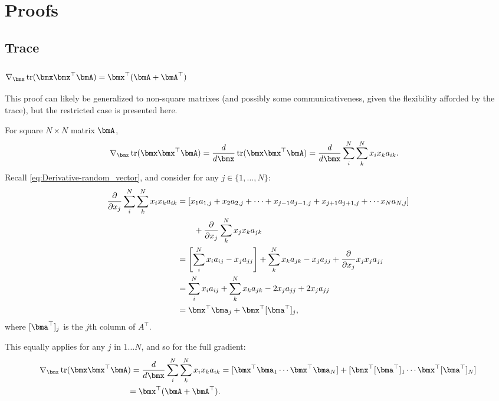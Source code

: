 \documentclass[11pt]{article}
\DeclareMathOperator{\Trace}{tr}
\begin{document}
\appendix
\section{Proofs}
\subsection{Trace}
\subsubsection{\hyperref[sec:Trace-Derivative-tr(xx'A)]{$\nabla_{\bmx}\Trace(\bmx \bmx^\top \bmA) = \bmx^\top (\bmA + \bmA^\top)$}}
\label{proof:Trace-Derivative-tr(xx'A)}
This proof can likely be generalized to non-square matrixes (and possibly some communicativeness, given the flexibility afforded by the trace), but the restricted case is presented here.

For square $N\times N$ matrix $\bmA$,
\begin{align*}
\nabla_{\bmx}\Trace(\bmx \bmx^\top \bmA) =
\frac{d}{d \bmx}\Trace(\bmx \bmx^\top \bmA) &=
\frac{d}{d \bmx} \sum_{i}^{N} \sum_{k}^{N} x_i x_k a_{ik}.
\end{align*}
Recall \cref{eq:Derivative-random_vector}, and consider for any $j \in \{1,\ldots, N\}$:
\begin{align*}
\frac{\partial}{\partial x_j} \sum_{i}^{N} \sum_{k}^{N} x_i x_k a_{ik} &=
[x_1a_{1,j} + x_2a_{2,j} + \cdots + x_{j-1}a_{j-1,j} + x_{j+1}a_{j+1,j} + \cdots x_N a_{N,j}] \\ &\qquad + \frac{\partial}{\partial x_j} \sum_{k}^{N} x_j x_k a_{jk} \\
&= \left[\sum_i^N x_ia_{ij} - x_ja_{jj}\right] + \sum_{k}^{N} x_k a_{jk} - x_ja_{jj} + \frac{\partial}{\partial x_j} x_j x_j a_{jj} \\
&= \sum_i^N x_ia_{ij} + \sum_{k}^{N} x_k a_{jk} - 2 x_ja_{jj} + 2 x_ja_{jj} \\
&= \bmx^\top \bma_j + \bmx^\top [\bma^\top]_j,
\end{align*}
where $[\bma^\top]_j$ is the $j$th column of $A^\top$.

This equally applies for any $j$ in $1\ldots N$, and so for the full gradient:
\begin{align*}
\nabla_{\bmx}\Trace(\bmx \bmx^\top \bmA) =
\frac{d}{d \bmx} \sum_{i}^{N} \sum_{k}^{N} x_i x_k a_{ik} &=
[\bmx^\top \bma_1 \cdots \bmx^\top \bma_N] + [\bmx^\top [\bma^\top]_1 \cdots \bmx^\top [\bma^\top]_N] \\
= \bmx^\top (\bmA + \bmA^\top).
\end{align*}
\end{document}
